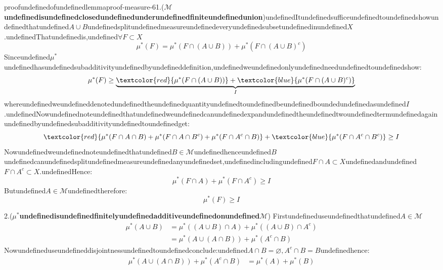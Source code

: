 \begin{mystthmproof}{proofundefinedofundefinedlemma}{proof-measure-6}1.(\textbf{$\mathcal M$undefinedisundefinedclosedundefinedunderundefinedfiniteundefinedunion})undefinedItundefinedsufficeundefinedtoundefinedshowundefinedthatundefined$A \cup B$undefinedsplitundefinedmeasureundefinedeveryundefinedsubsetundefinedinundefined$X$.undefinedThatundefinedis,undefined$\forall F\subset X$
\begin{equation}
\mu^*(F)=\mu^*(F\cap(A\cup B)) + \mu^*(F\cap(A\cup B)^c)
\end{equation}
Sinceundefined$\mu^*$undefinedhasundefinedsubadditivityundefinedbyundefineddefinition,undefinedweundefinedonlyundefinedneedundefinedtoundefinedshow:
\begin{equation}
\mu^*(F)\geq \underbrace{\textcolor{red}{\mu^*(F\cap(A\cup B))} + \textcolor{blue}{\mu^*(F\cap(A\cup B)^c)}}_{I}
\end{equation}
whereundefinedweundefineddenotedundefinedtheundefinedquantityundefinedtoundefinedbeundefinedboundedundefinedasundefined$I$.undefinedNowundefinednoteundefinedthatundefinedweundefinedcanundefinedexpandundefinedtheundefinedtwoundefinedtermundefinedagainundefinedbyundefinedsubadditivityundefinedtoundefinedget:
\begin{equation}
\textcolor{red}{\mu^*(F\cap A \cap B) + \mu^*(F\cap A \cap B^c)+\mu^*(F\cap A^c \cap B)} + \textcolor{blue}{\mu^*(F\cap A^c \cap B^c)}\geq I
\end{equation}
Nowundefinedweundefinednoteundefinedthatundefined$B\in \mathcal M$undefinedhenceundefined$B$undefinedcanundefinedsplitundefinedmeasureundefinedanyundefinedset,undefinedincludingundefined$F\cap A\subset X$undefinedandundefined$F\cap A^c \subset X$.undefinedHence:
\begin{equation}
\mu^*(F\cap A) +\mu^*(F \cap A^c)\geq I
\end{equation}
Butundefined$A \in \mathcal M$undefinedtherefore:
\begin{equation}
\mu^*(F)\geq I
\end{equation}

2.(\textbf{$\mu^{*}$undefinedisundefinedfinitelyundefinedadditiveundefinedonundefined$\mathcal M$})
Firstundefineduseundefinedthatundefined$A\in \mathcal M$
\begin{equation}
\begin{aligned}
\mu^*(A\cup B) &= \mu^*((A\cup B)\cap A) +  \mu^*((A\cup B)\cap A^c) \\
&= \mu^*(A\cup (A\cap B))  +  \mu^*(A^c \cap B)
\end{aligned}
\end{equation}
Nowundefineduseundefineddisjointnessundefinedtoundefinedconclude:undefined$A\cap B=\varnothing, A^c \cap B = B$undefinedhence:
\begin{equation}
\begin{aligned}
\mu^*(A\cup (A\cap B))  +  \mu^*(A^c \cap B) &= \mu^*(A)+\mu^*(B)
\end{aligned}
\end{equation}

\end{mystthmproof}

